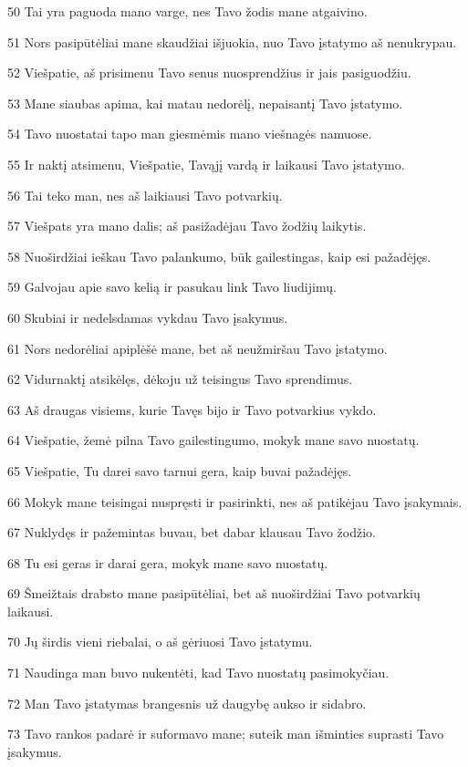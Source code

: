 \par 50 Tai yra paguoda mano varge, nes Tavo žodis mane atgaivino. 
\par 51 Nors pasipūtėliai mane skaudžiai išjuokia, nuo Tavo įstatymo aš nenukrypau. 
\par 52 Viešpatie, aš prisimenu Tavo senus nuosprendžius ir jais pasiguodžiu. 
\par 53 Mane siaubas apima, kai matau nedorėlį, nepaisantį Tavo įstatymo. 
\par 54 Tavo nuostatai tapo man giesmėmis mano viešnagės namuose. 
\par 55 Ir naktį atsimenu, Viešpatie, Tavąjį vardą ir laikausi Tavo įstatymo. 
\par 56 Tai teko man, nes aš laikiausi Tavo potvarkių. 
\par 57 Viešpats yra mano dalis; aš pasižadėjau Tavo žodžių laikytis. 
\par 58 Nuoširdžiai ieškau Tavo palankumo, būk gailestingas, kaip esi pažadėjęs. 
\par 59 Galvojau apie savo kelią ir pasukau link Tavo liudijimų. 
\par 60 Skubiai ir nedelsdamas vykdau Tavo įsakymus. 
\par 61 Nors nedorėliai apiplėšė mane, bet aš neužmiršau Tavo įstatymo. 
\par 62 Vidurnaktį atsikėlęs, dėkoju už teisingus Tavo sprendimus. 
\par 63 Aš draugas visiems, kurie Tavęs bijo ir Tavo potvarkius vykdo. 
\par 64 Viešpatie, žemė pilna Tavo gailestingumo, mokyk mane savo nuostatų. 
\par 65 Viešpatie, Tu darei savo tarnui gera, kaip buvai pažadėjęs. 
\par 66 Mokyk mane teisingai nuspręsti ir pasirinkti, nes aš patikėjau Tavo įsakymais. 
\par 67 Nuklydęs ir pažemintas buvau, bet dabar klausau Tavo žodžio. 
\par 68 Tu esi geras ir darai gera, mokyk mane savo nuostatų. 
\par 69 Šmeižtais drabsto mane pasipūtėliai, bet aš nuoširdžiai Tavo potvarkių laikausi. 
\par 70 Jų širdis vieni riebalai, o aš gėriuosi Tavo įstatymu. 
\par 71 Naudinga man buvo nukentėti, kad Tavo nuostatų pasimokyčiau. 
\par 72 Man Tavo įstatymas brangesnis už daugybę aukso ir sidabro. 
\par 73 Tavo rankos padarė ir suformavo mane; suteik man išminties suprasti Tavo įsakymus. 
